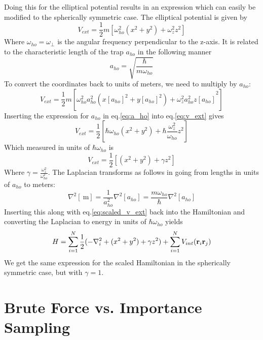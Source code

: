 \documentclass[
    a4paper, aps, twocolumn, floatfix, superscriptaddress,
    nofootinbib]{revtex4-1}
\begin{document}
\begin{appendices}
Doing this for the elliptical potential results in an expression which can easily be modified to the spherically symmetric case. The elliptical potential is given by
\begin{equation}\label{eq:v_ext}
    V_{ext} = \frac{1}{2}m[\omega_{ho}^2 (x^2+y^2) + \omega_z^2 z^2]
\end{equation}
Where $\omega_{ho}=\omega_{\perp}$ is the angular frequency perpendicular to the z-axis. It is related to the characteristic length of the trap $a_{ho}$ in the following manner
\begin{equation}\label{eq:a_ho}
    a_{ho} = \sqrt{\frac{\hbar}{m \omega_{ho}}}
\end{equation}
To convert the coordinates back to units of meters, we need to multiply by $a_{ho}$:  
\begin{equation}
    V_{ext} = \frac{1}{2}m\left[ \omega_{ho}^2{a_{ho}^2 (x[a_{ho}]^2+y[a_{ho}]^2) + \omega_z^2 a_{ho}^2z[a_{ho}]}^2 \right]
\end{equation}
Inserting the expression for $a_{ho}$ in eq.\eqref{eq:a_ho} into eq.\eqref{eq:v_ext} gives 
\begin{equation}
     V_{ext} = \frac{1}{2}[\hbar\omega_{ho} (x^2+y^2) + \hbar \frac{\omega_z^2}{\omega_{ho}} z^2]
\end{equation}
Which measured in units of $\hbar \omega_{ho}$ is
\begin{equation}\label{eq:scaled_v_ext}
     V_{ext} = \frac{1}{2}[(x^2+y^2) + \gamma z^2]
\end{equation}
Where $\gamma = \frac{\omega_z^2}{\omega_{ho}^2}$. The Laplacian transforms as follows in going from lengths in units of $a_{ho}$ to meters: 
\begin{equation}
    \nabla^2[\SI{}{\meter}] = \frac{1}{a_{ho}^2} \nabla^2[a_{ho}] = \frac{m\omega_{ho}}{\hbar}\nabla^2[a_{ho}]
\end{equation}
Inserting this along with eq.\eqref{eq:scaled_v_ext} back into the Hamiltonian and converting the Laplacian to energy in units of $\hbar \omega_{ho}$ yields 
\begin{equation}
    H = \sum_{i=1}^{N} \frac{1}{2}(-\nabla_i^2 +(x^2+y^2) + \gamma z^2) + \sum_{i=1}^N V_{int}(\bold r_i \bold r_j)
\end{equation}
We get the same expression for the scaled Hamiltonian in the spherically symmetric case, but with $\gamma = 1$.

\section{Brute Force vs. Importance Sampling}



\end{appendices}
\end{document}

